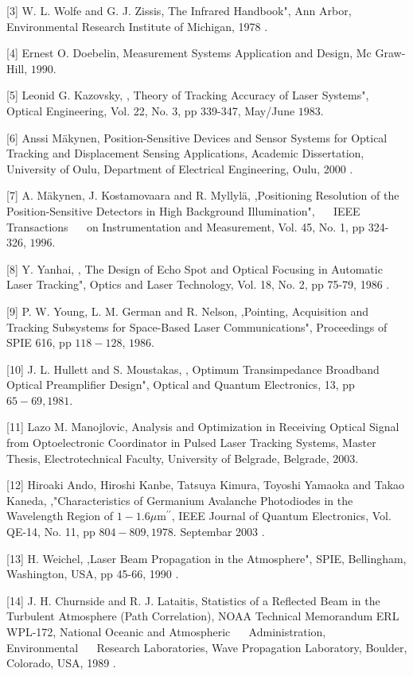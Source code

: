 \documentclass[10pt]{article}
\begin{document}
[3] W. L. Wolfe and G. J. Zissis, The Infrared Handbook", Ann Arbor, Environmental Research Institute of Michigan, 1978 .

[4] Ernest O. Doebelin, Measurement Systems Application and Design, Mc Graw-Hill, \(1990 .\)

[5] Leonid G. Kazovsky, , Theory of Tracking Accuracy of Laser Systems", Optical Engineering, Vol. 22, No. 3, pp 339-347, May/June \(1983 .\)

[6] Anssi Mäkynen, Position-Sensitive Devices and Sensor Systems for Optical Tracking and Displacement Sensing Applications, Academic Dissertation, University of Oulu, Department of Electrical Engineering, Oulu, 2000 .

[7] A. Mäkynen, J. Kostamovaara and R. Myllylä, ,Positioning Resolution of the Position-Sensitive Detectors in High Background Illumination", \(\quad\) IEEE \(\quad\) Transactions \(\quad\) on Instrumentation and Measurement, Vol. 45, No. 1, pp 324-326, \(1996 .\)

[8] Y. Yanhai, , The Design of Echo Spot and Optical Focusing in Automatic Laser Tracking", Optics and Laser Technology, Vol. 18, No. 2, pp 75-79, 1986 .

[9] P. W. Young, L. M. German and R. Nelson, ,Pointing, Acquisition and Tracking Subsystems for Space-Based Laser Communications", Proceedings of SPIE 616, pp \(118-128\), \(1986 .\)

[10] J. L. Hullett and S. Moustakas, , Optimum Transimpedance Broadband Optical Preamplifier Design", Optical and Quantum Electronics, 13, pp \(65-69,1981\).

[11] Lazo M. Manojlovic, Analysis and Optimization in Receiving Optical Signal from Optoelectronic Coordinator in Pulsed Laser Tracking Systems, Master Thesis, Electrotechnical Faculty, University of Belgrade, Belgrade, \(2003 .\)

[12] Hiroaki Ando, Hiroshi Kanbe, Tatsuya Kimura, Toyoshi Yamaoka and Takao Kaneda, ,"Characteristics of Germanium Avalanche Photodiodes in the Wavelength Region of \(1-1.6 \mu \mathrm{m}^{\prime \prime}\), IEEE Journal of Quantum Electronics, Vol. QE-14, No. 11, pp \(804-809,1978 .\) Septembar 2003 .

[13] H. Weichel, ,Laser Beam Propagation in the Atmosphere", SPIE, Bellingham, Washington, USA, pp 45-66, 1990 .

[14] J. H. Churnside and R. J. Lataitis, Statistics of a Reflected Beam in the Turbulent Atmosphere (Path Correlation), NOAA Technical Memorandum ERL WPL-172, National Oceanic and Atmospheric \(\quad\) Administration, \(\quad\) Environmental \(\quad\) Research Laboratories, Wave Propagation Laboratory, Boulder, Colorado, USA, 1989 .
\end{document}
